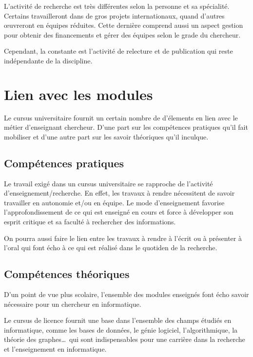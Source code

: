 \documentclass[14pt, a4paper]{report}
\begin{document}
    L'activité de recherche est très différentes selon la personne et sa spécialité. Certains travailleront dans de gros projets internationaux, quand d'autres œuvreront en équipes réduites.
    Cette dernière comprend aussi un aspect gestion pour obtenir des financements et gérer des équipes selon le grade du chercheur.

    Cependant, la constante est l'activité de relecture et de publication qui reste indépendante de la discipline.

  \section{Lien avec les modules}

	Le cursus universitaire fournit un certain nombre de d'élements en lien avec le métier d'enseignant chercheur. D'une part sur les compétences pratiques qu'il fait mobiliser et d'une autre part sur les savoir théoriques qu'il inculque.

    \subsection{Compétences pratiques}


    Le travail exigé dans un cursus universitaire se rapproche de l'activité d'enseignement/recherche. En effet, les travaux à rendre nécessitent de savoir travailler en autonomie et/ou en équipe.
    Le mode d'enseignement favorise l'approfondissement de ce qui est enseigné en cours et force à développer son esprit critique et sa faculté à rechercher des informations.

    On pourra aussi faire le lien entre les travaux à rendre à l'écrit ou à présenter à l'oral qui font écho à ce qui est réalisé dans le quotiden de la recherche.

    \subsection{Compétences théoriques}

    D'un point de vue plus scolaire, l'ensemble des modules enseignés font écho savoir nécessaire pour un chercheur en informatique.

    Le cursus de licence fournit une base dans l'ensemble des champs étudiés en informatique, comme les bases de données, le génie logiciel, l'algorithmique, la théorie des graphes\dots\ qui sont indispensables pour une carrière dans la recherche et l'enseignement en informatique.
\end{document}
